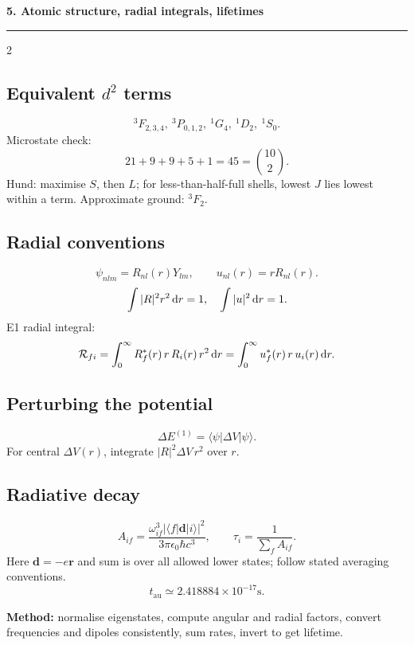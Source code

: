 
{\Large\bfseries\color{accent}5. Atomic structure, radial integrals, lifetimes}
\hrule\smallskip
\begin{multicols}{2}
\subsection*{Equivalent \(d^2\) terms}
\[
{}^3F_{2,3,4},\ {}^3P_{0,1,2},\
{}^1G_4,\ {}^1D_2,\ {}^1S_0.
\]
Microstate check:
\[
21+9+9+5+1=45=\binom{10}{2}.
\]
Hund: maximise \(S\), then \(L\);
for less-than-half-full shells, lowest \(J\)
lies lowest within a term. Approximate ground: \({}^3F_2\).
\subsection*{Radial conventions}
\[
\psi_{nlm}=R_{nl}(r)Y_{lm},\qquad
u_{nl}(r)=rR_{nl}(r).
\]
\[
\int|R|^2r^2\,\mathrm{d} r=1,\quad \int|u|^2\,\mathrm{d} r=1.
\]
E1 radial integral:
\[
\mathcal R_{fi}=\int_0^\infty R_f^*(r)\,r\,R_i(r)\,r^2\,\mathrm{d} r
=\int_0^\infty u_f^*(r)\,r\,u_i(r)\,\mathrm{d} r.
\]
\subsection*{Perturbing the potential}
\[
\Delta E^{(1)}=\langle\psi|\Delta V|\psi\rangle.
\]
For central \(\Delta V(r)\), integrate
\(|R|^2\Delta V\,r^2\) over \(r\).
\subsection*{Radiative decay}
\[
A_{if}=\frac{\omega_{if}^3|\langle f|\mathbf d|i\rangle|^2}
{3\pi\epsilon_0\hbar c^3},
\qquad
\tau_i=\frac1{\sum_{f}A_{if}}.
\]
Here \(\mathbf d=-e\mathbf r\) and sum is over all
allowed lower states; follow stated averaging conventions.
\[
t_{\mathrm{au}}\simeq2.418884\times10^{-17}\mathrm{s}.
\]
\begin{methodbox}
\textbf{Method:} normalise eigenstates,
compute angular and radial factors,
convert frequencies and dipoles consistently,
sum rates, invert to get lifetime.
\end{methodbox}
\end{multicols}
